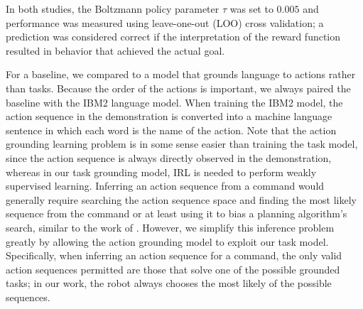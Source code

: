 \documentclass[conference]{IEEEtran}
\begin{document}
In both studies, the Boltzmann policy parameter $\tau$ was set to $0.005$ and performance was measured using leave-one-out (LOO) cross validation; a prediction was considered correct if the interpretation of the reward function resulted in behavior that achieved the actual goal. 

For a baseline, we compared to a model that grounds language to actions rather than tasks. Because the order of the actions is important, we always paired the baseline with the IBM2 language model. When training the IBM2 model, the action sequence in the demonstration is converted into a machine language sentence in which each word is the name of the action. Note that the action grounding learning problem is in some sense easier than training the task model, since the action sequence is always directly observed in the demonstration, whereas in our task grounding model, IRL is needed to perform weakly supervised learning. Inferring an action sequence from a command would generally require searching the action sequence space and finding the most likely sequence from the command or at least using it to bias a planning algorithm's search, similar to the work of \citet{chen11}. However, we simplify this inference problem greatly by allowing the action grounding model to exploit our task model. Specifically, when inferring an action sequence for a command, the only valid action sequences permitted are those that solve one of the possible grounded tasks; in our work, the robot always chooses the most likely of the possible sequences.
\end{document}
